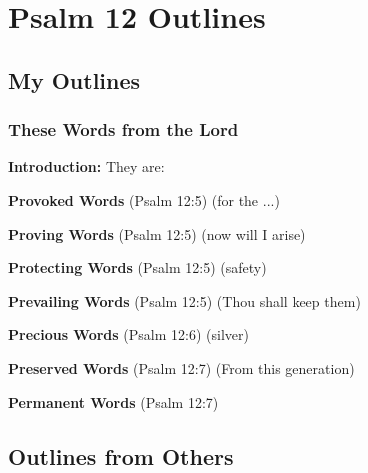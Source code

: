 \section{Psalm 12 Outlines}

\subsection{My Outlines}

\subsubsection{These Words from the Lord}
\textbf{Introduction: }They are:\\
\begin{compactenum}[I.]
    \item \textbf{Provoked Words} (Psalm 12:5) (for the ...)
    \item \textbf{Proving Words} (Psalm 12:5) (now will I arise)
    \item \textbf{Protecting Words} (Psalm 12:5) (safety)
    \item \textbf{Prevailing Words} (Psalm 12:5) (Thou shall keep them)
    \item \textbf{Precious Words} (Psalm 12:6) (silver)
    \item \textbf{Preserved Words} (Psalm 12:7) (From this generation)
    \item \textbf{Permanent Words} (Psalm 12:7)
\end{compactenum}


\subsection{Outlines from Others}

